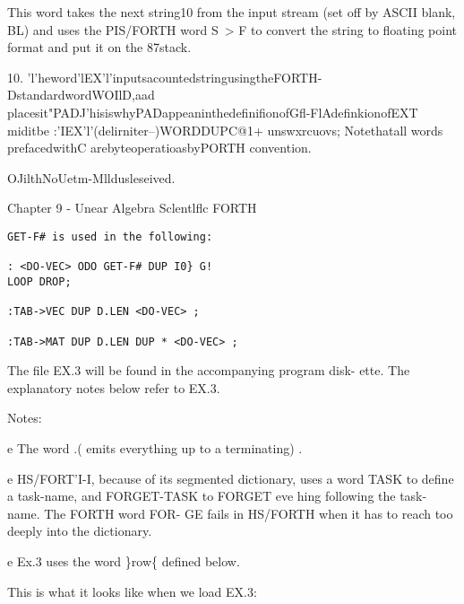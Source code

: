 This word takes the next string10 from the input stream (set off
by ASCII blank, BL) and uses the PIS/FORTH word S~> F to
convert the string to floating point format and put it on the
87stack.

 

10. 'l'heword'lEX'l'inputsacountedstringusingtheFORTH-DstandardwordWOIlD,aad
placesit"PADJ'hisiswhyPADappeaninthedeﬁniﬁonofGfl-FlAdeﬁnkionofEXT
miditbe :'IEX'l'(delirniter--)WORDDUPC@1+ unswxrcuovs; Notethatall
words prefacedwithC arebyteoperatioasbyPORTH convention.

OJilthNoUetm-Mlldusleseived.

Chapter 9 - Unear Algebra Sclentlflc FORTH

\begin{verbatim}
GET-F# is used in the following:

: <DO-VEC> ODO GET-F# DUP I0} G!
LOOP DROP;

:TAB->VEC DUP D.LEN <DO-VEC> ;

:TAB->MAT DUP D.LEN DUP * <DO-VEC> ;
\end{verbatim}

The ﬁle EX.3 will be found in the accompanying program disk-
ette. The explanatory notes below refer to EX.3.

Notes:

e The word .( emits everything up to a terminating) .

e HS/FORT'I-I, because of its segmented dictionary, uses a word
TASK to deﬁne a task-name, and FORGET-TASK to FORGET
eve hing following the task-name. The FORTH word FOR-
GE fails in HS/FORTH when it has to reach too deeply into
the dictionary.

e Ex.3 uses the word \}row\{ deﬁned below.

This is what it looks like when we load EX.3:


